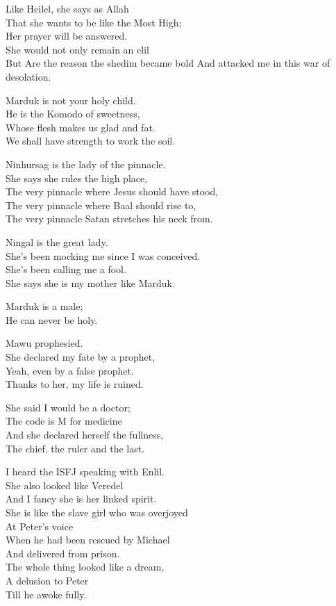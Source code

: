 \documentclass[
]{book}
\begin{document}
Like Heilel, she says as Allah\\
That she wants to be like the Most High;\\
Her prayer will be answered.\\
She would not only remain an elil\\
But Are the reason the shedim became bold And attacked me in this
war of desolation.

Marduk is not your holy child.\\
He is the Komodo of sweetness,\\
Whose flesh makes us glad and fat.\\
We shall have strength to work the soil.

Ninhursag is the lady of the pinnacle.\\
She says she rules the high place,\\
The very pinnacle where Jesus should have stood,\\
The very pinnacle where Baal should rise to,\\
The very pinnacle Satan stretches his neck from.

Ningal is the great lady.\\
She's been mocking me since I was conceived.\\
She's been calling me a fool.\\
She says she is my mother like Marduk.

Marduk is a male;\\
He can never be holy.

Mawu prophesied.\\
She declared my fate by a prophet,\\
Yeah, even by a false prophet.\\
Thanks to her, my life is ruined.

She said I would be a doctor;\\
The code is M for medicine\\
And she declared herself the fullness,\\
The chief, the ruler and the last.

I heard the ISFJ speaking with Enlil.\\
She also looked like Veredel\\
And I fancy she is her linked spirit.\\
She is like the slave girl who was overjoyed\\
At Peter's voice\\
When he had been rescued by Michael\\
And delivered from prison.\\
The whole thing looked like a dream,\\
A delusion to Peter\\
Till he awoke fully.
\end{document}
